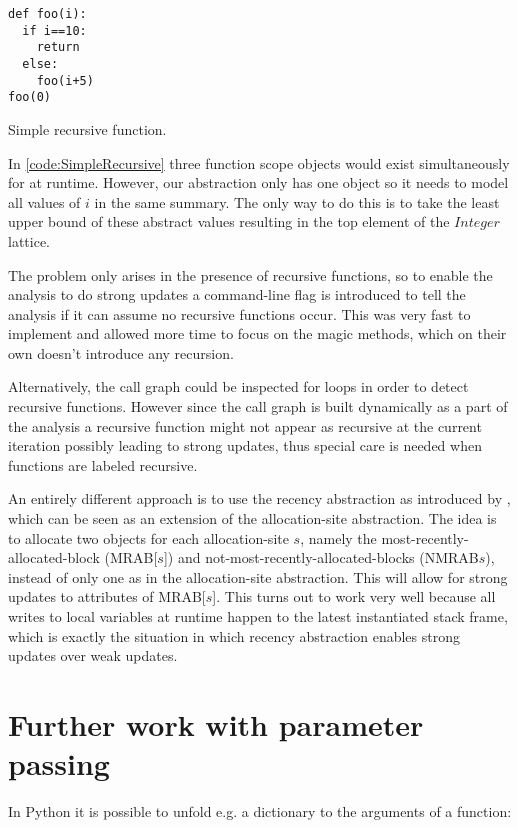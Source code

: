 \begin{listing}[H]
	\begin{verbatim}
def foo(i):
  if i==10:
    return
  else:
    foo(i+5)
foo(0)
	\end{verbatim}
\caption{Simple recursive function.}
\label{code:SimpleRecursive}
\end{listing}

In \autoref{code:SimpleRecursive} three function scope objects would exist simultaneously for  at runtime. However, our abstraction only has one object so it needs to model all values of $i$ in the same summary. The only way to do this is to take the least upper bound of these abstract values resulting in the top element of the $Integer$ lattice.

The problem only arises in the presence of recursive functions, so to enable the analysis to do strong updates a command-line flag is introduced to tell the analysis if it can assume no recursive functions occur. This was very fast to implement and allowed more time to focus on the magic methods, which on their own doesn't introduce any recursion.

Alternatively, the call graph could be inspected for loops in order to detect recursive functions. However since the call graph is built dynamically as a part of the analysis a recursive function might not appear as recursive at the current iteration possibly leading to strong updates, thus special care is needed when functions are labeled recursive.

An entirely different approach is to use the recency abstraction as introduced by \cite{recency}, which can be seen as an extension of the allocation-site abstraction. The idea is to allocate two objects for each allocation-site $s$, namely the most-recently-allocated-block (MRAB[$s$]) and not-most-recently-allocated-blocks (NMRAB$s$), instead of only one as in the allocation-site abstraction. This will allow for strong updates to attributes of MRAB[$s$]. This turns out to work very well because all writes to local variables at runtime happen to the latest instantiated stack frame, which is exactly the situation in which recency abstraction enables strong updates over weak updates.

\newpage

\section{Further work with parameter passing}
In Python it is possible to unfold e.g. a dictionary to the arguments of a function:

